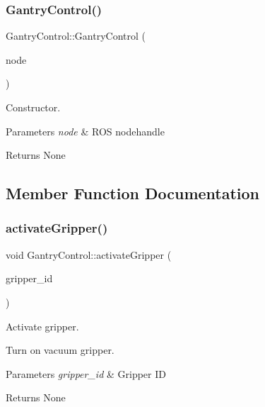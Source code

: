 \subsubsection{\texorpdfstring{Gantry\+Control()}{GantryControl()}}
{\footnotesize\ttfamily Gantry\+Control\+::\+Gantry\+Control (\begin{DoxyParamCaption}\item[{ros\+::\+Node\+Handle \&}]{node }\end{DoxyParamCaption})}



Constructor. 


\begin{DoxyParams}{Parameters}
{\em node} & R\+OS nodehandle \\
\hline
\end{DoxyParams}
\begin{DoxyReturn}{Returns}
None 
\end{DoxyReturn}


\subsection{Member Function Documentation}
\mbox{\label{classGantryControl_aaccd9c43b5564c198288ba51cbcecabe}} 
\subsubsection{\texorpdfstring{activate\+Gripper()}{activateGripper()}}
{\footnotesize\ttfamily void Gantry\+Control\+::activate\+Gripper (\begin{DoxyParamCaption}\item[{std\+::string}]{gripper\+\_\+id }\end{DoxyParamCaption})}



Activate gripper. 

Turn on vacuum gripper.


\begin{DoxyParams}{Parameters}
{\em gripper\+\_\+id} & Gripper ID \\
\hline
\end{DoxyParams}
\begin{DoxyReturn}{Returns}
None 
\end{DoxyReturn}
\mbox{\label{classGantryControl_a31672ce076ba59662af6c77c82ab136f}} 
